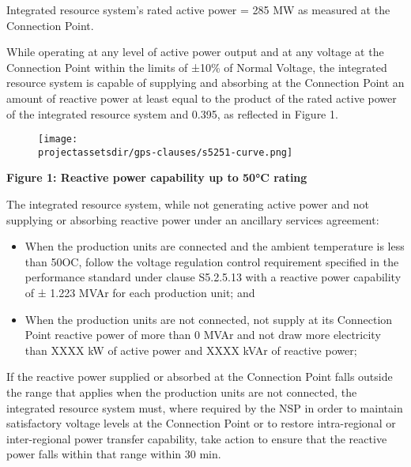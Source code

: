 Integrated resource system's rated active power = 285 MW as measured at the Connection Point.

While operating at any level of active power output and at any voltage at the Connection Point within the limits of ±10\% of Normal Voltage, the integrated resource system is capable of supplying and absorbing at the Connection Point an amount of reactive power at least equal to the product of the rated active power of the integrated resource system and 0.395, as reflected in Figure 1.

\begin{figure}[H]
	\centering
	\texttt{[image: \\projectassetsdir/gps-clauses/s5251-curve.png]}
\end{figure}
\textbf{Figure 1: Reactive power capability up to 50°C rating}

The integrated resource system, while not generating active power and not supplying or absorbing reactive power under an ancillary services agreement:
\begin{itemize}
	\item When the production units are connected and the ambient temperature is less than 50OC, follow the voltage regulation control requirement specified in the performance standard under clause S5.2.5.13 with a reactive power capability of ± 1.223 MVAr for each production unit; and
	\item When the production units are not connected, not supply at its Connection Point reactive power of more than 0 MVAr and not draw more electricity than XXXX kW of active power and XXXX kVAr of reactive power;
\end{itemize}

If the reactive power supplied or absorbed at the Connection Point falls outside the range that applies when the production units are not connected, the integrated resource system must, where required by the NSP in order to maintain satisfactory voltage levels at the Connection Point or to restore intra-regional or inter-regional power transfer capability, take action to ensure that the reactive power falls within that range within 30 min.

